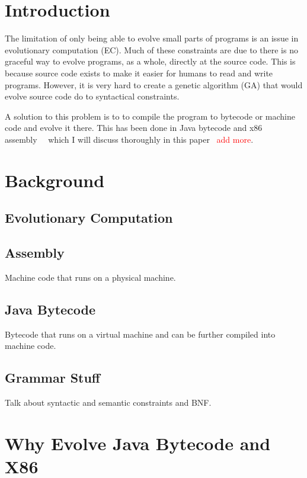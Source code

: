 \documentclass{sig-alternate}
\newcommand{\mycomment}[1]{\textcolor{red}{#1}}
\begin{document}
\terms{}

\keywords{}

\section{Introduction}
	The limitation of only being able to evolve small parts of programs is an issue in evolutionary computation (EC). Much of these constraints are due to there is no graceful way to evolve programs, as a whole, directly at the source code. This is because source code exists to make it easier for humans to read and write programs. However, it is very hard to create a genetic algorithm (GA) that would evolve source code do to syntactical constraints.\par
	A solution to this problem is to to compile the program to bytecode or machine code and evolve it there. This has been done in Java bytecode and x86 assembly~\cite{FINCH:2010}~\cite{Assembly:2010} which I will discuss thoroughly in this paper ~\mycomment{add more}.
	

	
	

\section{Background}

\subsection{Evolutionary Computation}
\subsection{Assembly}
Machine code that runs on a physical machine.
\subsection{Java Bytecode}
Bytecode that runs on a virtual machine and can be further compiled into machine code. 
\subsection{Grammar Stuff}
Talk about syntactic and semantic constraints and BNF.


\section{Why Evolve Java Bytecode and X86}
\end{document}
